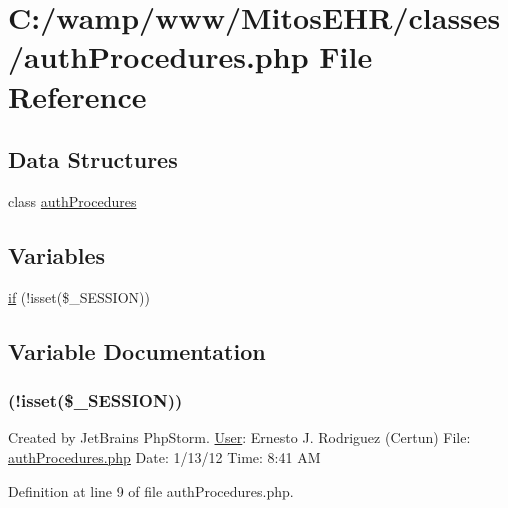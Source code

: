 \hypertarget{auth_procedures_8php}{\section{\-C\-:/wamp/www/\-Mitos\-E\-H\-R/classes/auth\-Procedures.php \-File \-Reference}
\label{auth_procedures_8php}
}
\subsection*{\-Data \-Structures}
\begin{DoxyCompactItemize}
\item 
class \hyperlink{classauth_procedures}{auth\-Procedures}
\end{DoxyCompactItemize}
\subsection*{\-Variables}
\begin{DoxyCompactItemize}
\item 
\hyperlink{auth_procedures_8php_a8ceca98aa29914fd2479a84a8d2242fb}{if} (!isset(\$\-\_\-\-S\-E\-S\-S\-I\-O\-N))
\end{DoxyCompactItemize}


\subsection{\-Variable \-Documentation}
\hypertarget{auth_procedures_8php_a8ceca98aa29914fd2479a84a8d2242fb}{
\subsubsection[{if}]{(!isset(\$\-\_\-\-S\-E\-S\-S\-I\-O\-N))}}\label{auth_procedures_8php_a8ceca98aa29914fd2479a84a8d2242fb}
\-Created by \-Jet\-Brains \-Php\-Storm. \hyperlink{class_user}{\-User}\-: \-Ernesto \-J. \-Rodriguez (\-Certun) \-File\-: \hyperlink{auth_procedures_8php}{auth\-Procedures.\-php} \-Date\-: 1/13/12 \-Time\-: 8\-:41 \-A\-M 

\-Definition at line 9 of file auth\-Procedures.\-php.

